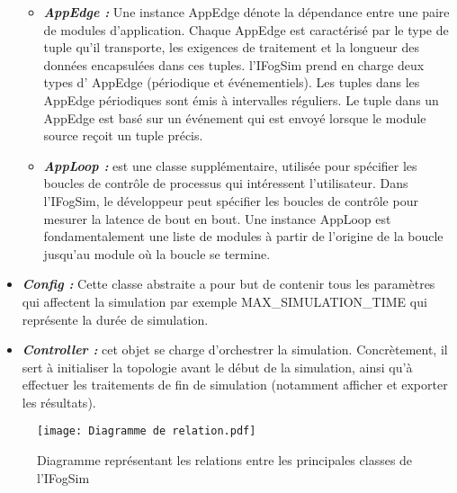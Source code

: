 \begin{itemize}
    \begin{itemize}
        \item \textbf{\emph{AppEdge :}} Une instance AppEdge dénote la dépendance entre une paire de modules d'application. Chaque AppEdge est caractérisé par le type de tuple qu'il transporte, les exigences de traitement et la longueur des données encapsulées dans ces tuples. l'IFogSim prend en charge deux types d' AppEdge (périodique et événementiels). Les tuples dans les AppEdge périodiques sont émis à intervalles réguliers. Le tuple dans un AppEdge est basé sur un événement qui est envoyé lorsque le module source reçoit un tuple précis.
        \item \textbf{\emph{AppLoop :}} est une classe supplémentaire, utilisée pour spécifier les boucles de contrôle de processus qui intéressent l'utilisateur. Dans l'IFogSim, le développeur peut spécifier les boucles de contrôle pour mesurer la latence de bout en bout. Une instance AppLoop est fondamentalement une liste de modules à partir de l'origine de la boucle jusqu'au module où la boucle se termine.
    \end{itemize}
    \item \textbf{\emph{Config :}} Cette classe abstraite a pour but de contenir tous les paramètres qui affectent la simulation par exemple MAX\_SIMULATION\_TIME qui représente la durée de simulation.
    \item \textbf{\emph{Controller :}} cet objet se charge d'orchestrer la simulation. Concrètement, il sert à initialiser la topologie avant le début de la simulation, ainsi qu'à effectuer les traitements de fin de simulation (notamment afficher et exporter les résultats).
\end{itemize}
\begin{figure}[H]
    \centering
    \texttt{[image: Diagramme de relation.pdf]}
    \caption{Diagramme représentant les relations entre les principales classes de l'IFogSim}
\end{figure}

